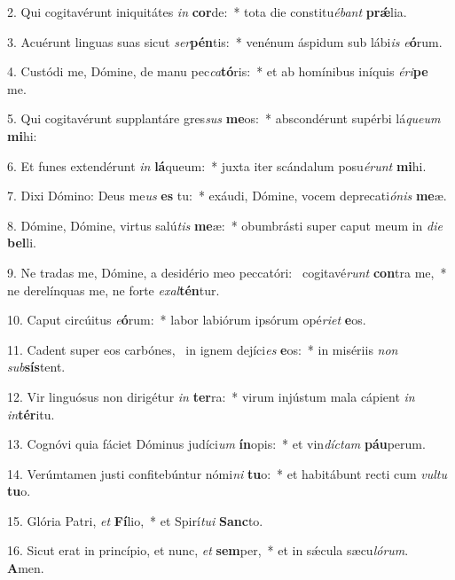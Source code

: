 2. Qui cogitavérunt iniquitátes \textit{in} \textbf{cor}de:~*  tota die constitu\textit{é}\textit{bant} \textbf{prǽ}lia.\

3. Acuérunt linguas suas sicut \textit{ser}\textbf{pén}tis:~*  venénum áspidum sub lábi\textit{is} \textit{e}\textbf{ó}rum.\

4. Custódi me, Dómine, de manu pec\textit{ca}\textbf{tó}ris:~*  et ab homínibus iníquis \textit{é}\textit{ri}\textbf{pe} me.\

5. Qui cogitavérunt supplantáre gres\textit{sus} \textbf{me}os:~*  abscondérunt supérbi lá\textit{que}\textit{um} \textbf{mi}hi:\

6. Et funes extendérunt \textit{in} \textbf{lá}queum:~*  juxta iter scándalum posu\textit{é}\textit{runt} \textbf{mi}hi.\

7. Dixi Dómino: Deus me\textit{us} \textbf{es} tu:~*  exáudi, Dómine, vocem deprecati\textit{ó}\textit{nis} \textbf{me}æ.\

8. Dómine, Dómine, virtus salú\textit{tis} \textbf{me}æ:~*  obumbrásti super caput meum in \textit{di}\textit{e} \textbf{bel}li.\

9. Ne tradas me, Dómine, a desidério meo peccatóri: \dag\  cogitavé\textit{runt} \textbf{con}tra me,~*  ne derelínquas me, ne forte \textit{ex}\textit{al}\textbf{tén}tur.\

10. Caput circúitus \textit{e}\textbf{ó}rum:~*  labor labiórum ipsórum opé\textit{ri}\textit{et} \textbf{e}os.\

11. Cadent super eos carbónes, \dag\  in ignem dejíci\textit{es} \textbf{e}os:~*  in misériis \textit{non} \textit{sub}\textbf{sís}tent.\

12. Vir linguósus non dirigétur \textit{in} \textbf{ter}ra:~*  virum injústum mala cápient \textit{in} \textit{in}\textbf{tér}itu.\

13. Cognóvi quia fáciet Dóminus judíci\textit{um} \textbf{ín}opis:~*  et vin\textit{díc}\textit{tam} \textbf{páu}perum.\

14. Verúmtamen justi confitebúntur nómi\textit{ni} \textbf{tu}o:~*  et habitábunt recti cum \textit{vul}\textit{tu} \textbf{tu}o.\

15. Glória Patri, \textit{et} \textbf{Fí}lio,~*  et Spirí\textit{tu}\textit{i} \textbf{Sanc}to.\

16. Sicut erat in princípio, et nunc, \textit{et} \textbf{sem}per,~*  et in sǽcula sæcu\textit{ló}\textit{rum}. \textbf{A}men.\

